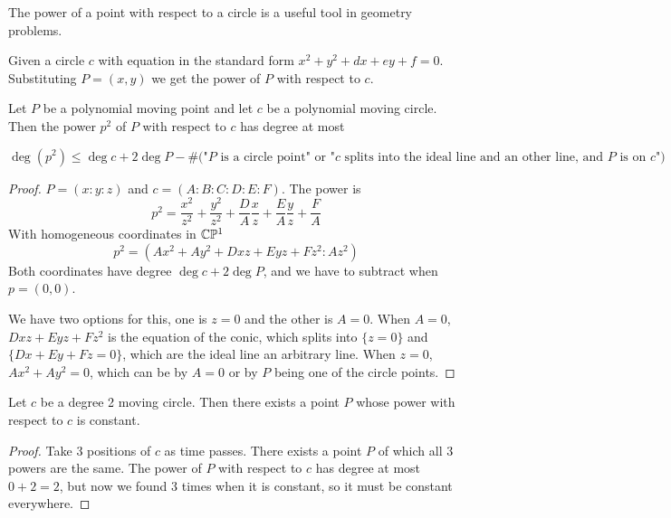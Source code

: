 \documentclass[a4paper]{article}
\begin{document}
The power of a point with respect to a circle is a useful tool in geometry problems.

Given a circle $c$ with equation in the standard form $x^2+y^2+dx+ey+f=0$. Substituting $P=(x,y)$ we get the power of $P$ with respect to $c$.

\begin{theorem}
    Let $P$ be a polynomial moving point and let $c$ be a polynomial moving circle. Then the power $p^2$ of $P$ with respect to $c$ has degree at most

    $$\deg (p^2)\le\deg c+2\deg P-\#(\text{"$P$ is a circle point" or "$c$ splits into the ideal line and an other line, and $P$ is on $c$")}$$
\end{theorem}
\begin{proof}
    $P=(x:y:z)$ and $c=(A:B:C:D:E:F)$. The power is
    $$p^2=\frac{x^2}{z^2}+\frac{y^2}{z^2}+\frac{D}{A}\frac{x}{z}+\frac{E}{A}\frac{y}{z}+\frac{F}{A}$$
    With homogeneous coordinates in $\mathbb{C}\mathbb{P}^1$
    $$p^2=(Ax^2+Ay^2+Dxz+Eyz+Fz^2:Az^2)$$
    Both coordinates have degree $\deg c+2\deg P$, and we have to subtract when $p=(0,0)$.

    We have two options for this, one is $z=0$ and the other is $A=0$. When $A=0$, $Dxz+Eyz+Fz^2$ is the equation of the conic, which splits into $\{z=0\}$ and $\{Dx+Ey+Fz=0\}$, which are the ideal line an arbitrary line.
    When $z=0$, $Ax^2+Ay^2=0$, which can be by $A=0$ or by $P$ being one of the circle points.
\end{proof}


\begin{corollary}
    Let $c$ be a degree 2 moving circle. Then there exists a point $P$ whose power with respect to $c$ is constant.
\end{corollary}
\begin{proof}
    Take 3 positions of $c$ as time passes. There exists a point $P$ of which all 3 powers are the same. The power of $P$ with respect to $c$ has degree at most $0+2=2$, but now we found 3 times when it is constant, so it must be constant everywhere.
\end{proof}
\end{document}
